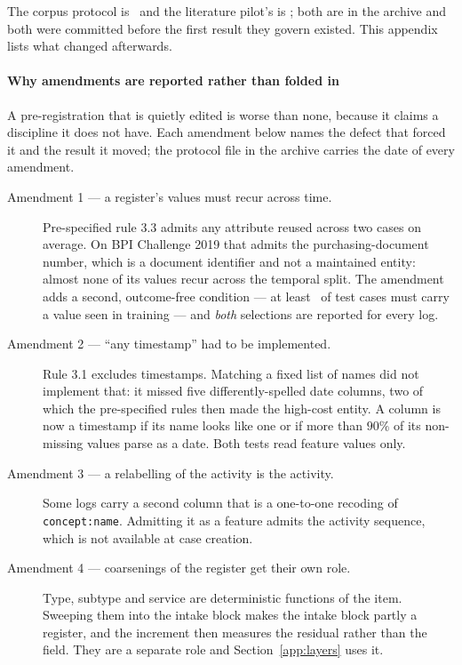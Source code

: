 
The corpus protocol is \protocolfile\ and the literature pilot's is
\pilotprotocolfile; both are in the archive and both were committed
before the first result they govern existed. This appendix lists what changed
afterwards.

\paragraph{Why amendments are reported rather than folded in}
A pre-registration that is quietly edited is worse than none, because it
claims a discipline it does not have. Each amendment below names the defect
that forced it and the result it moved; the protocol file in the archive
carries the date of every amendment.

\begin{description}
\item[Amendment 1 --- a register's values must recur across time.]
Pre-specified rule 3.3 admits any attribute reused across two cases on average.
On BPI Challenge 2019 that admits the purchasing-document number, which is a
document identifier and not a maintained entity: almost none of its values
recur across the temporal split. The amendment adds a second, outcome-free
condition --- at least \minTrainCoverage\ of test cases must carry a value
seen in training --- and \emph{both} selections are reported for every log.

\item[Amendment 2 --- ``any timestamp'' had to be implemented.]
Rule 3.1 excludes timestamps. Matching a fixed list of names did not implement
that: it missed five differently-spelled date columns, two of which the
pre-specified rules then made the high-cost entity. A column is now a timestamp
if its name looks like one or if more than $90\%$ of its non-missing values
parse as a date. Both tests read feature values only.

\item[Amendment 3 --- a relabelling of the activity is the activity.]
Some logs carry a second column that is a one-to-one recoding of
\texttt{concept:name}. Admitting it as a feature admits the activity sequence,
which is not available at case creation.

\item[Amendment 4 --- coarsenings of the register get their own role.]
Type, subtype and service are deterministic functions of the item. Sweeping
them into the intake block makes the intake block partly a register, and the
increment then measures the residual rather than the field. They are a
separate role and Section~\ref{app:layers} uses it.


\end{description}
